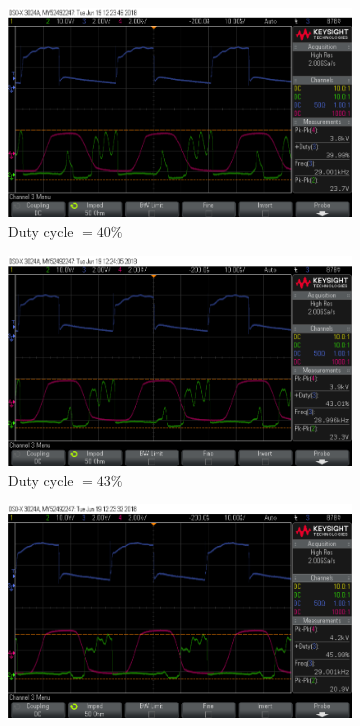 \documentclass[11pt]{article}
\begin{document}
\begin{figure}[h!]
\centering
\begin{subfigure}{0.49\textwidth}
\centering
\includegraphics[width = \textwidth]{thruster_sc_21}
\caption{Duty cycle $=40\%$}
\label{fig:thruster_sc_21}
\end{subfigure}
\begin{subfigure}{0.49\textwidth}
\centering
\includegraphics[width = \textwidth]{thruster_sc_23}
\caption{Duty cycle $=43\%$}
\label{fig:thruster_sc_23}
\end{subfigure}
\begin{subfigure}{0.49\textwidth}
\centering
\includegraphics[width = \textwidth]{thruster_sc_22}

\end{subfigure}
\end{figure}
\end{document}
